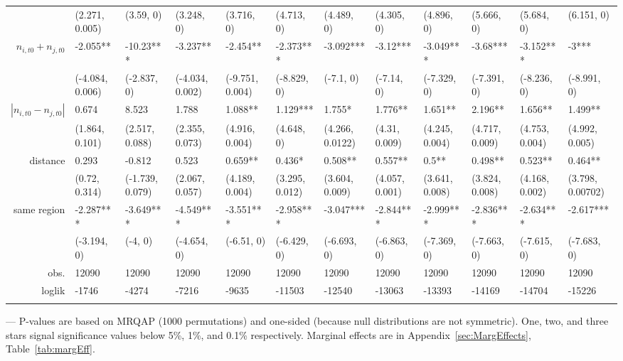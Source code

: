 {\begin{landscape}
\begin{table}[ht]
\begin{threeparttable}
\begin{tiny}
\begin{tabular}{rlllllllllll}
   & (2.271, 0.005) & (3.59, 0) & (3.248, 0) & (3.716, 0) & (4.713, 0) & (4.489, 0) & (4.305, 0) & (4.896, 0) & (5.666, 0) & (5.684, 0) & (6.151, 0) \\ 
 $n_{i,t0} + n_{j,t0}$ & -2.055** & -10.23*** & -3.237** & -2.454** & -2.373*** & -3.092*** & -3.12*** & -3.049*** & -3.68*** & -3.152*** & -3*** \\ 
   & (-4.084, 0.006) & (-2.837, 0) & (-4.034, 0.002) & (-9.751, 0.004) & (-8.829, 0) & (-7.1, 0) & (-7.14, 0) & (-7.329, 0) & (-7.391, 0) & (-8.236, 0) & (-8.991, 0) \\ 
  $|n_{i,t0} - n_{j,t0}|$ & 0.674 & 8.523 & 1.788 & 1.088** & 1.129*** & 1.755* & 1.776** & 1.651** & 2.196** & 1.656** & 1.499** \\ 
  & (1.864, 0.101) & (2.517, 0.088) & (2.355, 0.073) & (4.916, 0.004) & (4.648, 0) & (4.266, 0.0122) & (4.31, 0.009) & (4.245, 0.004) & (4.717, 0.009) & (4.753, 0.004) & (4.992, 0.005) \\ 
  distance & 0.293 & -0.812 & 0.523 & 0.659** & 0.436* & 0.508** & 0.557** & 0.5** & 0.498** & 0.523** & 0.464** \\ 
   & (0.72, 0.314) & (-1.739, 0.079) & (2.067, 0.057) & (4.189, 0.004) & (3.295, 0.012) & (3.604, 0.009) & (4.057, 0.001) & (3.641, 0.008) & (3.824, 0.008) & (4.168, 0.002) & (3.798, 0.00702) \\ 
   same region & -2.287*** & -3.649*** & -4.549*** & -3.551*** & -2.958*** & -3.047*** & -2.844*** & -2.999*** & -2.836*** & -2.634*** & -2.617*** \\ 
   & (-3.194, 0) & (-4, 0) & (-4.654, 0) & (-6.51, 0) & (-6.429, 0) & (-6.693, 0) & (-6.863, 0) & (-7.369, 0) & (-7.663, 0) & (-7.615, 0) & (-7.683, 0) \\ 
\noalign{\smallskip}\hline\noalign{\smallskip}
  obs. & 12090 & 12090 & 12090 & 12090 & 12090 & 12090 & 12090 & 12090 & 12090 & 12090 & 12090 \\ 
  loglik & -1746 & -4274 & -7216 & -9635 & -11503 & -12540 & -13063 & -13393 & -14169 & -14704 & -15226 \\ 
\noalign{\smallskip}\hline\noalign{\smallskip}
\end{tabular}
   \end{tiny}
       \begin{tablenotes}
  \footnotesize
  \item --- P-values are based on MRQAP (1000 permutations) and one-sided (because null distributions are not symmetric). One, two, and three stars signal significance values below 5\%, 1\%, and 0.1\% respectively. Marginal effects are in Appendix~\ref{sec:MargEffects}, Table~\ref{tab:margEff}.

\end{tablenotes}
\end{threeparttable}
\end{table}
\end{landscape}}
